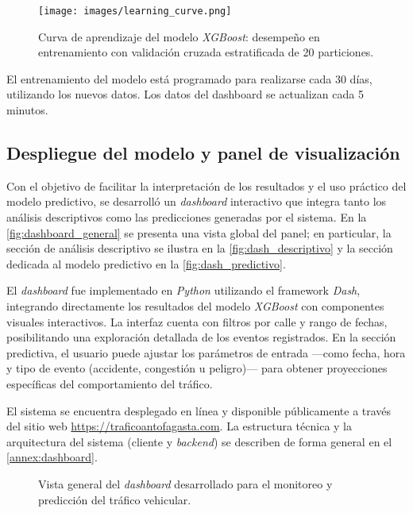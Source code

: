 \documentclass[12pt]{article}
\begin{document}
\begin{figure}[H]
    \centering
    \texttt{[image: images/learning\_curve.png]}
    \caption{Curva de aprendizaje del modelo \textit{XGBoost}: desempeño en entrenamiento con validación cruzada estratificada de 20 particiones.}
    \label{fig:learning_curve}
\end{figure}

El entrenamiento del modelo está programado para realizarse cada 30 días, utilizando los nuevos datos. Los datos del dashboard se actualizan cada 5 minutos.

\subsection{Despliegue del modelo y panel de visualización}

Con el objetivo de facilitar la interpretación de los resultados y el uso práctico del modelo predictivo, se desarrolló un \textit{dashboard} interactivo que integra tanto los análisis descriptivos como las predicciones generadas por el sistema. En la \autoref{fig:dashboard_general} se presenta una vista global del panel; en particular, la sección de análisis descriptivo se ilustra en la \autoref{fig:dash_descriptivo} y la sección dedicada al modelo predictivo en la \autoref{fig:dash_predictivo}.

El \textit{dashboard} fue implementado en \textit{Python} utilizando el framework \textit{Dash}, integrando directamente los resultados del modelo \textit{XGBoost} con componentes visuales interactivos. La interfaz cuenta con filtros por calle y rango de fechas, posibilitando una exploración detallada de los eventos registrados. En la sección predictiva, el usuario puede ajustar los parámetros de entrada —como fecha, hora y tipo de evento (accidente, congestión u peligro)— para obtener proyecciones específicas del comportamiento del tráfico.

El sistema se encuentra desplegado en línea y disponible públicamente a través del sitio web \url{https://traficoantofagasta.com}. La estructura técnica y la arquitectura del sistema (cliente y \textit{backend}) se describen de forma general en el \autoref{annex:dashboard}.

\begin{figure}[H]
    \centering
    \hfill
    \caption{Vista general del \textit{dashboard} desarrollado para el monitoreo y predicción del tráfico vehicular.}
    \label{fig:dashboard_general}
\end{figure}
\end{document}
